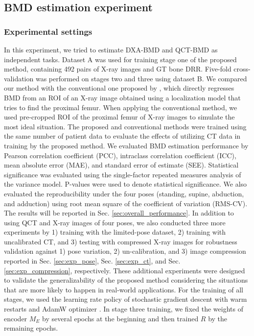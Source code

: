 \documentclass[times,twocolumn,final]{elsarticle}
\begin{document}
\subsection{BMD estimation experiment}
\subsubsection{Experimental settings}
In this experiment, we tried to estimate DXA-BMD and QCT-BMD as independent tasks.
Dataset A was used for training stage one of the proposed method, containing 492 pairs of X-ray images and GT bone DRR.
Five-fold cross-validation was performed on stages two and three using dataset B.
We compared our method with the conventional one proposed by \citet{hsieh_automated_2021}, which directly regresses BMD from an ROI of an X-ray image obtained using a localization model that tries to find the proximal femur. 
When applying the conventional method, we used pre-cropped ROI of the proximal femur of X-ray images to simulate the most ideal situation.
The proposed and conventional methods were trained using the same number of patient data to evaluate the effects of utilizing CT data in training by the proposed method.
We evaluated BMD estimation performance by Pearson correlation coefficient (PCC), intraclass correlation coefficient (ICC), mean absolute error (MAE), and standard error of estimate (SEE).
Statistical significance was evaluated using the single-factor repeated measures analysis of the variance model. 
P-values were used to denote statistical significance.
We also evaluated the reproducibility under the four poses (standing, supine, abduction, and adduction) using root mean square of the coefficient of variation (RMS-CV).
The results will be reported in Sec. \ref{sec:overall_performance}.
In addition to using QCT and X-ray images of four poses, we also conducted three more experiments by 1) training with the limited-pose dataset, 2) training with uncalibrated CT, and 3) testing with compressed X-ray images for robustness validation against 1) pose variation, 2) un-calibration, and 3) image compression reported in Sec. \ref{sec:exp_pose}, Sec. \ref{sec:exp_ct}, and Sec. \ref{sec:exp_compression}, respectively.
These additional experiments were designed to validate the generalizability of the proposed method considering the situations that are more likely to happen in real-world applications.
For the training of all stages, we used the learning rate policy of stochastic gradient descent with warm restarts \citep{loshchilov_sgdr_2017} and AdamW optimizer \citep{loshchilov_decoupled_2019}.
In stage three training, we fixed the weights of encoder $M_E$ by several epochs at the beginning and then trained $R$ by the remaining epochs.
\end{document}
